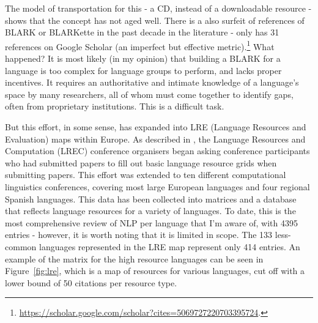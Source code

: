 The model of transportation for this - a CD, instead of a downloadable resource - shows that the concept has not aged well. There is a also surfeit of references of BLARK or BLARKette in the past decade in the literature - \citet{krauwer1998elsnet} only has 31 references on Google Scholar (an imperfect but effective metric).\footnote{\href{https://scholar.google.com/scholar?cites=5069727220703395724}{https://scholar.google.com/scholar?cites=5069727220703395724}. } What happened? It is most likely (in my opinion) that building a BLARK for a language is too complex for language groups to perform, and lacks proper incentives. It requires an authoritative and intimate knowledge of a language's space by many researchers, all of whom must come together to identify gaps, often from proprietary institutions. This is a difficult task.

But this effort, in some sense, has expanded into LRE (Language Resources and Evaluation) maps within Europe. As described in \citet{calzolari2010lrec, del2014lremap, mariani2015language, del2015visualising}, the Language Resources and Computation (LREC) conference organisers began asking conference participants who had submitted papers to fill out basic language resource grids when submitting papers. This effort was extended to ten different computational linguistics conferences, covering most large European languages and four regional Spanish languages. This data has been collected into matrices and a database that reflects language resources for a variety of languages. To date, this is the most comprehensive review of NLP per language that I'm aware of, with 4395 entries - however, it is worth noting that it is limited in scope. The 133 less-common languages represented in the LRE map represent only 414 entries. An example of the matrix for the high resource languages can be seen in Figure~\ref{fig:lre}, which is a map of resources for various languages, cut off with a lower bound of 50 citations per resource type.

